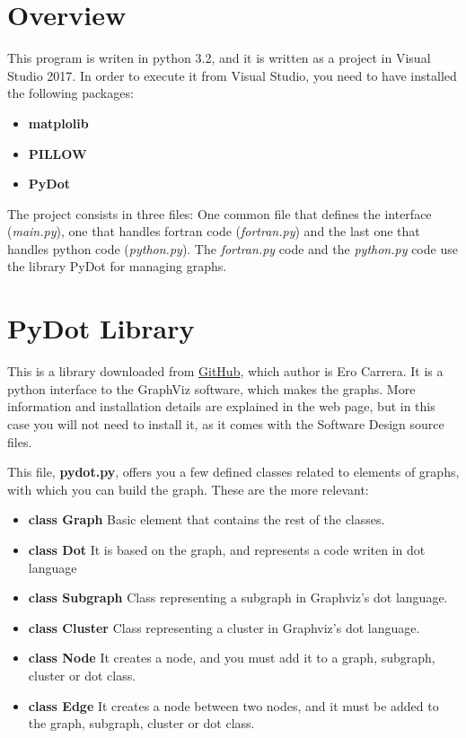 
\section*{Overview}

This program is writen in python 3.2, and it is written as a project in Visual Studio 2017. In order to execute it from Visual Studio, you need to have installed the following packages:

\begin{itemize}
	\item \textbf{matplolib}
	\item \textbf{PILLOW}
	\item \textbf{PyDot}
	\end{itemize}

 The project consists in three files: One common file that defines the interface (\textit{main.py}), one that handles fortran code (\textit{fortran.py}) and the last one that handles python code (\textit{python.py}). The \textit{fortran.py} code and the \textit{python.py} code use the library PyDot for managing graphs.


\section*{PyDot Library}

This is a library downloaded from \href{https://github.com/erocarrera/pydot}{GitHub}, which author is Ero Carrera. It is a python interface to the GraphViz software, which makes the graphs. More information and installation details are explained in the web page, but in this case you will not need to install it, as it comes with the Software Design source files. 

This file, \textbf{pydot.py}, offers you a few defined classes related to elements of graphs, with which you can build the graph. These are the more relevant:

\begin{itemize}
    \item \textbf{class Graph} Basic element that contains the rest of the classes.
    \item \textbf{class Dot} It is based on the graph, and represents a code writen in dot language
    \item \textbf{class Subgraph} Class representing a subgraph in Graphviz's dot language.
    \item \textbf{class Cluster} Class representing a cluster in Graphviz's dot language.
    \item \textbf{class Node} It creates a node, and you must  add it to a graph, subgraph, cluster or dot class.
    \item \textbf{class Edge} It creates a node between two nodes, and it must be added to the graph, subgraph, cluster or dot class.
\end{itemize}

